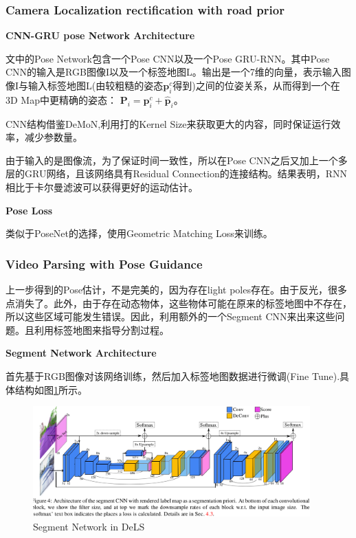 \subsubsection{Camera Localization rectification with road prior}

\textbf{CNN-GRU pose Network Architecture}

文中的Pose Network包含一个Pose CNN以及一个Pose GRU-RNN。其中Pose CNN的输入是RGB图像I以及一个标签地图L。输出是一个7维的向量，表示输入图像I与输入标签地图L(由较粗糙的姿态$\mathbf{p}_i^c$得到)之间的位姿关系，从而得到一个在3D Map中更精确的姿态：
$\mathbf{P}_i = \mathbf{p}_i^c + \hat{\mathbf{p}}_i$。

CNN结构借鉴DeMoN,利用打的Kernel Size来获取更大的内容，同时保证运行效率，减少参数量。

由于输入的是图像流，为了保证时间一致性，所以在Pose CNN之后又加上一个多层的GRU网络，且该网络具有Residual Connection的连接结构。结果表明，RNN相比于卡尔曼滤波可以获得更好的运动估计。

\textbf{Pose Loss}

类似于PoseNet的选择，使用Geometric Matching Loss来训练。

\subsubsection{Video Parsing with Pose Guidance}

上一步得到的Pose估计，不是完美的，因为存在light poles存在。由于反光，很多点消失了。此外，由于存在动态物体，这些物体可能在原来的标签地图中不存在，所以这些区域可能发生错误。因此，利用额外的一个Segment CNN来出来这些问题。且利用标签地图来指导分割过程。

\textbf{Segment Network Architecture}

首先基于RGB图像对该网络训练，然后加入标签地图数据进行微调(Fine Tune).具体结构如图\ref{SegmentDeLS}所示。

\begin{figure}[!hbtp]
\centering
\includegraphics[width=0.95\textwidth]{SemanticSLAM/DeLS2.png}
\caption{Segment Network in DeLS}
\label{SegmentDeLS}
\end{figure}

